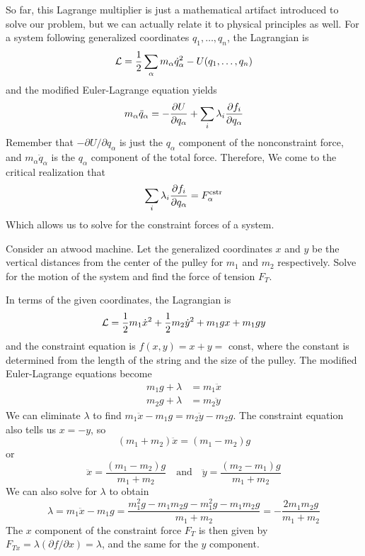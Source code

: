 So far, this Lagrange multiplier is just a mathematical artifact introduced to solve our problem, but we can actually relate it to physical principles as well. For a system following generalized coordinates $q_1, \dots, q_n$, the Lagrangian is
\[ \mathcal{L} = \frac{1}{2}\sum_\alpha m_\alpha \dot q_\alpha^2 - U(q_1, \dots, q_n)\]
and the modified Euler-Lagrange equation yields
\[ m_\alpha \ddot q_\alpha = -\pdv{U}{q_\alpha} + \sum_i \lambda_i \pdv{f_i}{q_\alpha} \]
Remember that $-\partial U/\partial q_\alpha$ is just the $q_\alpha$ component of the nonconstraint force, and $m_\alpha \ddot q_\alpha$ is the $q_\alpha$ component of the total force. Therefore, We come to the critical realization that
\[ \sum_i \lambda_i \pdv{f_i}{q_\alpha} = F^\text{cstr}_\alpha \]
Which allows us to solve for the constraint forces of a system. 
\begin{example}
    Consider an atwood machine. Let the generalized coordinates $x$ and $y$ be the vertical distances from the center of the pulley for $m_1$ and $m_2$ respectively. Solve for the motion of the system and find the force of tension $F_T$.

    In terms of the given coordinates, the Lagrangian is
    \[ \mathcal{L} = \frac{1}{2}m_1 \dot x^2 + \frac{1}{2}m_2 \dot y^2 + m_1gx + m_1gy \]
    and the constraint equation is $f(x,y) = x + y =$ const, where the constant is determined from the length of the string and the size of the pulley. The modified Euler-Lagrange equations become
    \begin{align*}
        m_1g + \lambda &= m_1\ddot x \\
        m_2g + \lambda &= m_2\ddot y 
    \end{align*}
    We can eliminate $\lambda$ to find $m_1\ddot x - m_1g = m_2\ddot y - m_2g$. The constraint equation also tells us $x = -y$, so 
    \[ (m_1+m_2)\ddot x = (m_1-m_2)g \]
    or 
    \[ \ddot x = \frac{(m_1-m_2)g}{m_1+m_2} \quad \text{and}\quad \ddot y = \frac{(m_2-m_1)g}{m_1+m_2} \]
    We can also solve for $\lambda$ to obtain
    \[ \lambda = m_1\ddot x - m_1g = \frac{m_1^2g-m_1m_2g - m_1^2g-m_1m_2g}{m_1+m_2} = -\frac{2m_1m_2g}{m_1+m_2}\]
    The $x$ component of the constraint force $F_T$ is then given by $F_{Tx} = \lambda (\partial f/\partial x) = \lambda$, and the same for the $y$ component. 
\end{example}